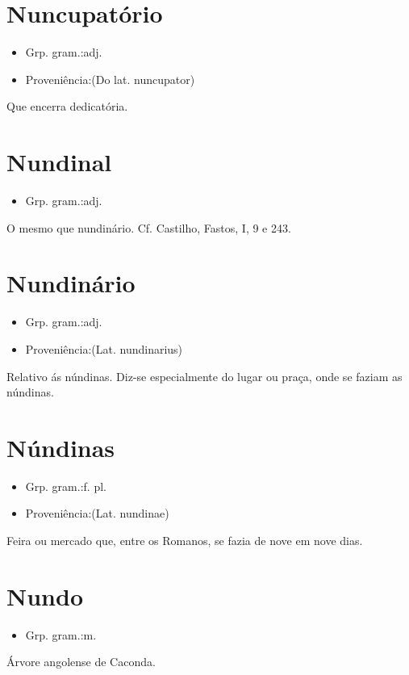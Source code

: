 \section{Nuncupatório}
\begin{itemize}
\item {Grp. gram.:adj.}
\end{itemize}
\begin{itemize}
\item {Proveniência:(Do lat. \textunderscore nuncupator\textunderscore )}
\end{itemize}
Que encerra dedicatória.
\section{Nundinal}
\begin{itemize}
\item {Grp. gram.:adj.}
\end{itemize}
O mesmo que \textunderscore nundinário\textunderscore . Cf. Castilho, \textunderscore Fastos\textunderscore , I, 9 e 243.
\section{Nundinário}
\begin{itemize}
\item {Grp. gram.:adj.}
\end{itemize}
\begin{itemize}
\item {Proveniência:(Lat. \textunderscore nundinarius\textunderscore )}
\end{itemize}
Relativo ás núndinas.
Diz-se especialmente do lugar ou praça, onde se faziam as núndinas.
\section{Núndinas}
\begin{itemize}
\item {Grp. gram.:f. pl.}
\end{itemize}
\begin{itemize}
\item {Proveniência:(Lat. \textunderscore nundinae\textunderscore )}
\end{itemize}
Feira ou mercado que, entre os Romanos, se fazia de nove em nove dias.
\section{Nundo}
\begin{itemize}
\item {Grp. gram.:m.}
\end{itemize}
Árvore angolense de Caconda.
